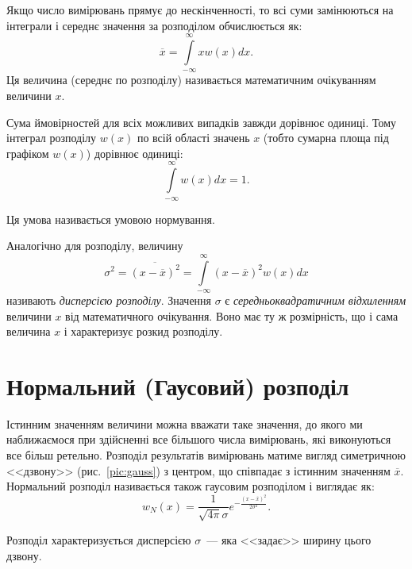 \documentclass{LabBook}
\begin{document}
  Якщо число вимірювань прямує до нескінченності, то всі суми замінюються на інтеграли і середнє значення за розподілом обчислюється як:
  \begin{equation}\label{eq:mean}
    \overline{x} = \int\limits_{-\infty}^{\infty} x w(x) dx .
  \end{equation}
  Ця величина (середнє по розподілу) називається математичним очікуванням величини $x$.

  Сума ймовірностей для всіх можливих випадків завжди дорівнює одиниці. Тому інтеграл розподілу $w(x)$ по всій області значень $x$ (тобто сумарна площа під графіком $w(x)$) дорівнює одиниці:
  \begin{equation}\label{eq:prob}
    \int\limits_{-\infty}^{\infty} w(x) dx = 1.
  \end{equation}

  Ця умова називається умовою нормування.

  Аналогічно для розподілу, величину
  \begin{equation}\label{eq:sigma}
    \sigma^2 = \overline{(x - \overline{x})^2} = \int\limits_{-\infty}^{\infty} (x - \overline{x})^2 w(x) dx
  \end{equation}
  називають \emph{дисперсією розподілу}. Значення $\sigma$ є \emph{середньоквадратичним відхиленням} величини $x$ від математичного очікування. Воно має ту ж розмірність, що і сама величина $x$ і характеризує розкид розподілу.


\section{Нормальний (Гаусовий) розподіл}


  Істинним значенням величини можна вважати таке значення, до якого ми наближаємося при здійсненні все більшого числа вимірювань, які виконуються все більш ретельно. Розподіл результатів вимірювань матиме вигляд симетричною <<дзвону>>  (рис.~\ref{pic:gauss})
  з центром, що співпадає з істинним значенням $\overline{x}$. Нормальний розподіл називається також гаусовим розподілом і виглядає як:
  \begin{equation}\label{eq:normal}
    w_N(x) = \frac{1}{\sqrt{4\pi}\sigma} e^{- \frac{(x - \overline{x})^2}{2\sigma^2}}.
  \end{equation}

  Розподіл характеризується дисперсією $\sigma$~--- яка <<задає>> ширину цього дзвону.
\end{document}
